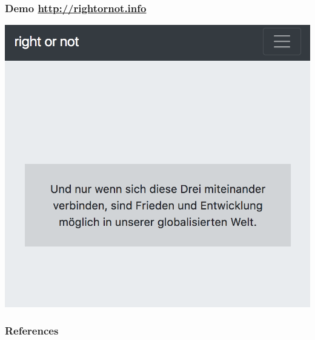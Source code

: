 \documentclass[]{beamer}
\begin{document}
\begin{frame}\frametitle{Demo \url{http://rightornot.info}}
\centering 
\includegraphics[width=.6\textwidth]{images/web-demo}\\
\end{frame}

\begin{frame}\frametitle{References}


\def\newblock{}
\vspace{2em}
 
\end{frame}
\end{document}
